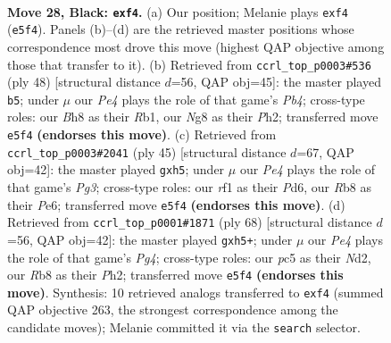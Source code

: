 \documentclass[11pt]{article}
\begin{document}
\clearpage

\begin{figure}[p]\centering
\begin{subfigure}{0.46\textwidth}\centering
\resizebox{\linewidth}{!}{%
\newchessgame
\chessboard[
  setfen={rr4nb/p2k1p1p/P1p3p1/2P1p3/4PP1P/8/4NB2/R4RK1 b - - 0 28},
  showmover=false,
  pgfstyle=straightmove, color=movearrow, markmove={e5-f4}
]}
\caption{}
\end{subfigure}\hfill
\begin{subfigure}{0.46\textwidth}\centering
\resizebox{\linewidth}{!}{%
\newchessgame
\chessboard[
  setfen={r2r1k2/3b1ppp/2p5/p2p4/PP4P1/4PP2/3KB2P/RR6 w - - 1 25},
  showmover=false,
  pgfstyle=straightmove, color=movearrow, markmove={b4-b5}
]}
\caption{}
\end{subfigure}
\\[4pt]
\begin{subfigure}{0.46\textwidth}\centering
\resizebox{\linewidth}{!}{%
\newchessgame
\chessboard[
  setfen={1r6/2p3k1/p1npprp1/1p5P/4P3/1Pb1B3/P1P1B1P1/2KR3R b - - 2 23},
  showmover=false,
  pgfstyle=straightmove, color=movearrow, markmove={g6-h5}
]}
\caption{}
\end{subfigure}\hfill
\begin{subfigure}{0.46\textwidth}\centering
\resizebox{\linewidth}{!}{%
\newchessgame
\chessboard[
  setfen={r1r2b2/3pn1p1/1B2p1k1/2P1P2p/p3R1P1/P2R4/3N2KP/8 w - - 3 35},
  showmover=false,
  pgfstyle=straightmove, color=movearrow, markmove={g4-h5}
]}
\caption{}
\end{subfigure}
\caption{\textbf{Move 28, Black: \texttt{exf4}.} (a) Our position; Melanie plays \texttt{exf4} (\texttt{e5f4}). Panels (b)--(d) are the retrieved master positions whose correspondence most drove this move (highest QAP objective among those that transfer to it). (b) Retrieved from \texttt{ccrl\_top\_p0003\#536} (ply 48) [structural distance $d$=56, QAP obj=45]: the master played \texttt{b5}; under $\mu$ our \emph{Pe4} plays the role of that game's \emph{Pb4}; cross-type roles: our \emph{B}h8 as their \emph{R}b1, our \emph{N}g8 as their \emph{P}h2; transferred move \texttt{e5f4} \textbf{(endorses this move)}. (c) Retrieved from \texttt{ccrl\_top\_p0003\#2041} (ply 45) [structural distance $d$=67, QAP obj=42]: the master played \texttt{gxh5}; under $\mu$ our \emph{Pe4} plays the role of that game's \emph{Pg3}; cross-type roles: our \emph{r}f1 as their \emph{P}d6, our \emph{R}b8 as their \emph{P}e6; transferred move \texttt{e5f4} \textbf{(endorses this move)}. (d) Retrieved from \texttt{ccrl\_top\_p0001\#1871} (ply 68) [structural distance $d$=56, QAP obj=42]: the master played \texttt{gxh5+}; under $\mu$ our \emph{Pe4} plays the role of that game's \emph{Pg4}; cross-type roles: our \emph{p}c5 as their \emph{N}d2, our \emph{R}b8 as their \emph{P}h2; transferred move \texttt{e5f4} \textbf{(endorses this move)}. Synthesis: 10 retrieved analogs transferred to \texttt{exf4} (summed QAP objective 263, the strongest correspondence among the candidate moves); Melanie committed it via the \texttt{search} selector.}
\label{fig:thought-m55}
\end{figure}
\end{document}
